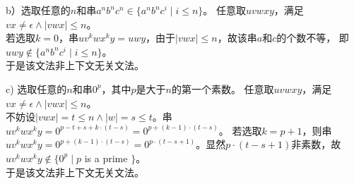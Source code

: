 \begin{solution}
b）选取任意的$n$和串$a^nb^nc^n \in \{a^nb^nc^i\mid i\le n\}$。
任意取$uvwxy$，满足$vx \neq \epsilon \wedge |vwx|\le n$。\\
若选取$k=0$，串$uv^kwx^ky = uwy$，由于$|vwx|\le n$，故该串$a$和$c$的个数不等，
即$uwy \notin \{a^nb^nc^i\mid i\le n\}$。\\
于是该文法非上下文无关文法。

c) 选取任意的$n$和串$0^p$，其中$p$是大于$n$的第一个素数。
任意取$uvwxy$，满足$vx \neq \epsilon \wedge |vwx|\le n$。\\
不妨设$|vwx|=t \le n \wedge |w|=s \le t$。串$uv^kwx^ky = 0^{p-t+s+k\cdot(t-s)} = 0^{p+(k-1)\cdot(t-s)}$。
若选取$k=p+1$，则串$uv^kwx^ky = 0^{p+(k-1)\cdot(t-s)} = 0^{p\cdot(t-s+1)}$。显然$p\cdot(t-s+1)$非素数，故
$uv^kwx^ky \notin \{0^p\mid p$ is a prime $\}$。\\
于是该文法非上下文无关文法。
\end{solution}